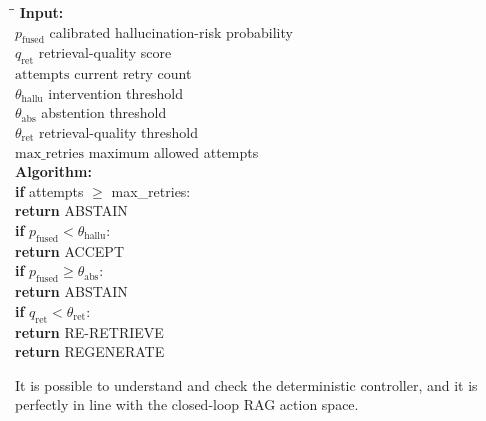 \begin{pseudocodebox}
\begin{tabbing}
\hspace{0.8cm}\=\hspace{3.6cm}\=\kill
\textbf{Input:}\\
\> $p_{\text{fused}}$ \> calibrated hallucination-risk probability\\
\> $q_{\text{ret}}$ \> retrieval-quality score\\
\> $\text{attempts}$ \> current retry count\\
\> $\theta_{\text{hallu}}$ \> intervention threshold\\
\> $\theta_{\text{abs}}$ \> abstention threshold\\
\> $\theta_{\text{ret}}$ \> retrieval-quality threshold\\
\> $\text{max\_retries}$ \> maximum allowed attempts\\[8pt]
\textbf{Algorithm:}\\
\> \textbf{if} attempts $\geq$ max\_retries:\\
\>\> \textbf{return} \textcolor{abstainred}{ABSTAIN}\\[3pt]
\> \textbf{if} $p_{\text{fused}} < \theta_{\text{hallu}}$:\\
\>\> \textbf{return} \textcolor{acceptgreen}{ACCEPT}\\[3pt]
\> \textbf{if} $p_{\text{fused}} \geq \theta_{\text{abs}}$:\\
\>\> \textbf{return} \textcolor{abstainred}{ABSTAIN}\\[3pt]
\> \textbf{if} $q_{\text{ret}} < \theta_{\text{ret}}$:\\
\>\> \textbf{return} \textcolor{regenblue}{RE-RETRIEVE}\\[3pt]
\> \textbf{return} \textcolor{regenblue}{REGENERATE}
\end{tabbing}
\end{pseudocodebox}

\vspace{0.5em}
\noindent It is possible to understand and check the deterministic controller, and it is perfectly in line with the closed-loop RAG action space.
